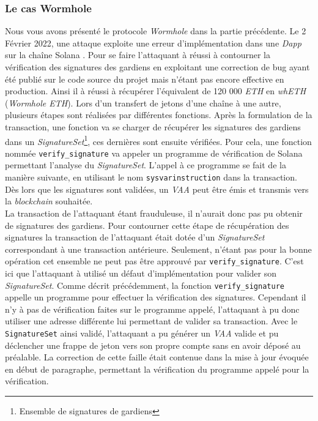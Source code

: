 \subsubsection{Le cas Wormhole}
Nous vous avons présenté le protocole \textit{Wormhole} dans la partie précédente. 
Le 2 Février 2022, une attaque exploite une erreur d'implémentation dans une \textit{Dapp} sur la chaîne Solana \cite{SolMed} \cite{SolRekt}. 
Pour se faire l'attaquant à réussi à contourner la vérification des signatures des gardiens en exploitant
une correction de bug ayant été publié sur le code source du projet mais n'étant pas encore effective en production.
Ainsi il à réussi à récupérer l'équivalent de 120 000 \textit{ETH} en \textit{whETH} (\textit{Wormhole ETH}). 
Lors d'un transfert de jetons d'une chaîne à une autre, plusieurs étapes sont réalisées par différentes fonctions.
Après la formulation de la transaction, une fonction va se charger de récupérer les signatures des gardiens dans un \textit{SignatureSet}\footnote{Ensemble de signatures de gardiens}, ces dernières sont ensuite vérifiées. 
Pour cela, une fonction nommée \texttt{verify\_signature} va appeler un programme de vérification de Solana permettant l'analyse du \textit{SignatureSet}. 
L'appel à ce programme se fait de la manière suivante, en utilisant le nom \texttt{sysvarinstruction} \cite{SolGitError} dans la transaction. 
Dès lors que les signatures sont validées, un \textit{VAA} peut être émis et transmis vers la \textit{blockchain} souhaitée. \\
La transaction de l'attaquant étant frauduleuse, il n'aurait donc pas pu obtenir de signatures des gardiens. 
Pour contourner cette étape de récupération des signatures la transaction de l'attaquant était dotée d'un \textit{SignatureSet} correspondant à une transaction antérieure. 
Seulement, n'étant pas pour la bonne opération cet ensemble ne peut pas être approuvé par \texttt{verify\_signature}. 
C'est ici que l'attaquant à utilisé un défaut d'implémentation pour valider son \textit{SignatureSet}. 
Comme décrit précédemment, la fonction \texttt{verify\_signature} appelle un programme pour effectuer la vérification des signatures. 
Cependant il n'y à pas de vérification faites sur le programme appelé, l'attaquant à pu donc utiliser une adresse différente lui permettant de valider sa transaction. 
Avec le  \texttt{SignatureSet} ainsi validé, l'attaquant a pu générer un \textit{VAA} valide et pu déclencher une frappe de jeton vers son propre compte sans en avoir déposé au préalable. 
La correction de cette faille était contenue dans la mise à jour évoquée en début de paragraphe\cite{SolGitFixed}, permettant la vérification du programme appelé pour la vérification. 

